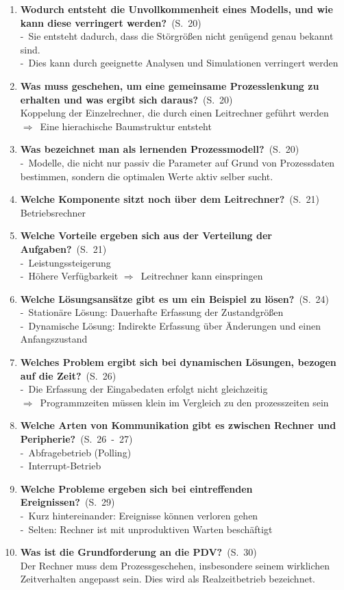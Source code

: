 \documentclass[a4paper,12pt]{article}
\newcommand{\question}[3]{\pagebreak[3]\item {\textbf{#1?}}\ (S.\ #2)#3}
\newcommand{\catchword}[1]{\\-\ #1}
\newcommand{\normaltext}[1]{\\#1}
\newcommand{\result}[1]{\\ $\Rightarrow$\ #1}
\newcommand{\resultol}[1]{ $\Rightarrow$\ #1}
\newcommand{\page}[1]{#1}
\newcommand{\pages}[2]{#1\ -\ #2}
\begin{document}
\begin{enumerate}
  \question{Wodurch entsteht die Unvollkommenheit eines Modells, und wie kann diese 
            verringert werden}{\page{20}}
  {
    \catchword{Sie entsteht dadurch, dass die Störgrößen nicht genügend genau bekannt sind.}
    \catchword{Dies kann durch geeignette Analysen und Simulationen verringert werden}
  }

  \question{Was muss geschehen, um eine gemeinsame Prozesslenkung zu erhalten und
            was ergibt sich daraus}{\page{20}}
  {
    \normaltext{Koppelung der Einzelrechner, die durch einen Leitrechner geführt werden}
    \result{Eine hierachische Baumstruktur entsteht}
  }

  \question{Was bezeichnet man als lernenden Prozessmodell}{\page{20}}
  {
    \catchword{Modelle, die nicht nur passiv die Parameter auf Grund von Prozessdaten bestimmen,
               sondern die optimalen Werte aktiv selber sucht.}
  }

  \question{Welche Komponente sitzt noch über dem Leitrechner}{\page{21}}
  {
    \normaltext{Betriebsrechner}
  }

  \question{Welche Vorteile ergeben sich aus der Verteilung der Aufgaben}{\page{21}}
  {
    \catchword{Leistungssteigerung}
    \catchword{Höhere Verfügbarkeit \resultol{Leitrechner kann einspringen}}
  }

  \question{Welche Lösungsansätze gibt es um ein Beispiel zu lösen}{\page{24}}
  {
    \catchword{Stationäre Lösung: Dauerhafte Erfassung der Zustandgrößen}
    \catchword{Dynamische Lösung: Indirekte Erfassung über Änderungen und einen Anfangszustand}
  }

  \question{Welches Problem ergibt sich bei dynamischen Lösungen, bezogen auf die Zeit}{\page{26}}
  {
    \catchword{Die Erfassung der Eingabedaten erfolgt nicht gleichzeitig}
    \result{Programmzeiten müssen klein im Vergleich zu den prozesszeiten sein}
  }

  \question{Welche Arten von Kommunikation gibt es zwischen Rechner und Peripherie}{\pages{26}{27}}
  {
    \catchword{Abfragebetrieb (Polling)}
    \catchword{Interrupt-Betrieb}
  }

  \question{Welche Probleme ergeben sich bei eintreffenden Ereignissen}{\page{29}}
  {
    \catchword{Kurz hintereinander: Ereignisse können verloren gehen}
    \catchword{Selten: Rechner ist mit unproduktiven Warten beschäftigt}
  }

  \question{Was ist die Grundforderung an die PDV}{\page{30}}
  {
    \normaltext{Der Rechner muss dem Prozessgeschehen, insbesondere seinem wirklichen
                Zeitverhalten angepasst sein. Dies wird als Realzeitbetrieb bezeichnet.}
  }



\end{enumerate}
\end{document}
